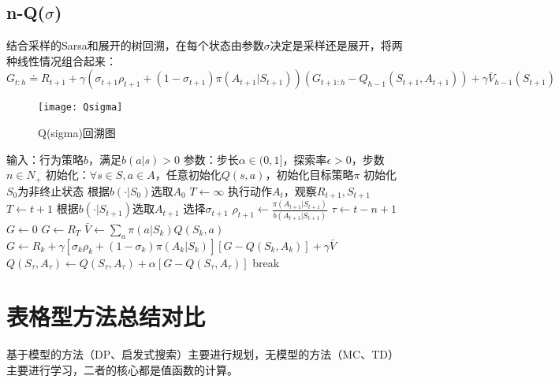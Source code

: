 \documentclass[
12pt, %
a4paper, 
oneside, %
headinclude,footinclude, %
]{scrartcl}
\begin{document}
\subsection[n-Q($ \sigma $)]{n-Q($ \sigma $)}
结合采样的Sarsa和展开的树回溯，在每个状态由参数$ \sigma $决定是采样还是展开，将两种线性情况组合起来：
$$ G_{t:h} \doteq R_{t + 1} + \gamma (\sigma_{t + 1} \rho_{t + 1} + (1 - \sigma_{t + 1}) \pi(A_{t + 1}|S_{t + 1}))(G_{t + 1:h} - Q_{h - 1}(S_{t + 1}, A_{t + 1})) + \gamma \bar{V}_{h - 1}(S_{t + 1}) $$

\begin{figure}[H]
\centering
\texttt{[image: Qsigma]}
\caption[Q(sigma)回溯图]{Q(sigma)回溯图}
\end{figure}
\begin{myalgorithm}
\State 输入：行为策略$ b $，满足$ b(a|s) > 0 $
\State 参数：步长$ \alpha \in (0,1] $，探索率$ \epsilon > 0 $，步数$ n \in N_+ $
\State 初始化：$ \forall s \in S, a \in A $，任意初始化$ Q(s, a) $，初始化目标策略$ \pi $
\State 初始化$ S_0 $为非终止状态
\State 根据$ b(\cdot|S_0) $选取$ A_0 $
\State $ T \gets \infty $
\State 执行动作$ A_t $，观察$ R_{t + 1},S_{t + 1} $
\State $ T \gets t + 1 $
\Else
\State 根据$ b(\cdot|S_{t + 1}) $选取$ A_{t + 1} $
\State 选择$ \sigma_{t + 1} $ 
\State $ \rho_{t + 1} \gets \frac{\pi(A_{t + 1}|S_{t + 1})}{b(A_{t + 1}|S_{t + 1})}$ 
\EndIf
\EndIf
\State $ \tau \gets t - n + 1 $ 
\State $ G \gets 0 $
\State $ G \gets R_T $
\Else
\State $ \bar{V} \gets \sum_a \pi(a|S_k)Q(S_k, a) $ 
\State $ G \gets R_k + \gamma[\sigma_k \rho_k + (1 - \sigma_k)\pi(A_k|S_k)][G - Q(S_k,A_k)] + \gamma\bar{V} $
\EndIf
\EndFor
\State $ Q(S_{\tau},A_{\tau}) \gets Q(S_{\tau},A_{\tau}) + \alpha[G - Q(S_{\tau},A_{\tau})] $
\EndIf
{}
\State break
\EndIf
\EndFor
\EndFor
\end{myalgorithm}
\section{表格型方法总结对比}
基于模型的方法（DP、启发式搜索）主要进行规划，无模型的方法（MC、TD）主要进行学习，二者的核心都是值函数的计算。
\end{document}
